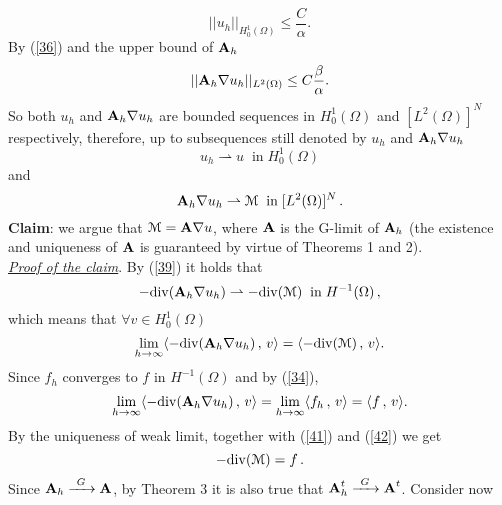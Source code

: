 \documentclass[11pt, epsf]{amsart}
\begin{document}
\begin{equation}\label{36}
||u_h||_{H_0^1(\Omega)}\leq \frac{C}{\alpha}.
\end{equation}
By (\ref{36}) and the upper bound of $\text{\textbf{A}}_h$
\begin{equation}\label{37}
||\text{\textbf{A}}_h\nabla u_h||_{L^2(\Omega)}\leq C\frac{\beta}{\alpha}.
\end{equation}
So both $u_h$ and $\text{\textbf{A}}_h\nabla u_h$ are bounded sequences in $H_0^1(\Omega)$ and $[L^2(\Omega)]^N$ respectively, therefore, up to subsequences still denoted by $u_h$ and  $\text{\textbf{A}}_h\nabla u_h$
\begin{equation}\label{38}
u_h\rightharpoonup u\;\;\text{in}\; H_0^1(\Omega)
\end{equation}
and
\begin{equation}\label{39}
\text{\textbf{A}}_h\nabla u_h\rightharpoonup \mathcal{M}\;\;\text{in}\; [L^2(\Omega)]^N\, .
\end{equation}
\textbf{Claim}: we argue that $\mathcal{M}=\text{\textbf{A}}\nabla u$, where $\text{\textbf{A}}$ is the G-limit of $\text{\textbf{A}}_h$ (the existence and uniqueness of $\text{\textbf{A}}$ is guaranteed by virtue of Theorems 1 and 2).\\
\underline{\emph{Proof of the claim}}. By (\ref{39}) it holds that
\begin{equation}\label{40}
-{\rm div}(\text{\textbf{A}}_h\nabla u_h)\rightharpoonup -{\rm div}(\mathcal{M})\;\;\text{in}\; H^{-1}(\Omega)\,,
\end{equation}
which means that $\forall v\in H_0^1(\Omega)$
\begin{equation}\label{41}
\lim_{h\to\infty}\langle-{\rm div}(\text{\textbf{A}}_h\nabla u_h)\, ,\, v\rangle = \langle-{\rm div}(\mathcal{M})\, ,\, v\rangle.
\end{equation}
Since $f_h$ converges to $f$ in $H^{-1}(\Omega)$ and by (\ref{34}),
\begin{equation}\label{42}
\lim_{h\to\infty}\langle-{\rm div}(\text{\textbf{A}}_h\nabla u_h)\, ,\, v\rangle = \lim_{h\to\infty}\langle f_h\, ,\, v\rangle= \langle f\, ,\, v\rangle.
\end{equation}
By the uniqueness of weak limit, together with (\ref{41}) and (\ref{42}) we get
\begin{equation}\label{43}
-{\rm div}(\mathcal{M})=f\, .
\end{equation}
Since $\text{\textbf{A}}_h\xrightarrow{\;\,{\tiny G}\;\,}\text{\textbf{A}}$, by Theorem 3 it is also true that $\text{\textbf{A}}_h^t\xrightarrow{\;\,{\tiny G}\;\,}\text{\textbf{A}}^t$. Consider now
\end{document}
